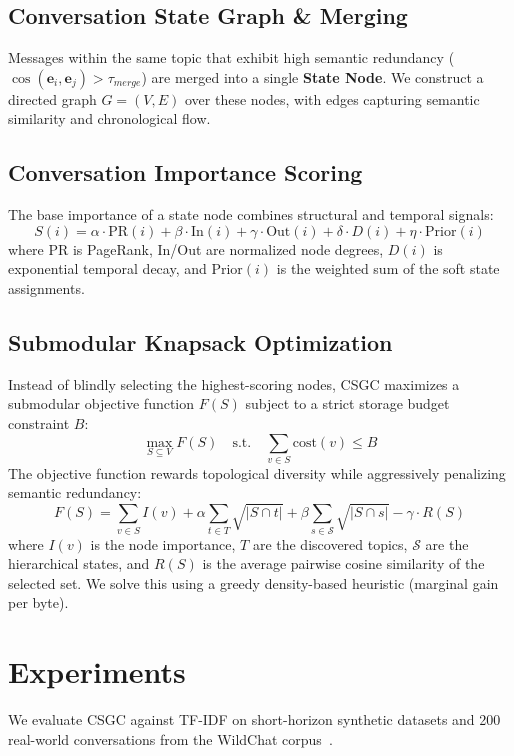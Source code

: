 \documentclass[10pt,twocolumn,letterpaper]{article}
\begin{document}
\subsection{Conversation State Graph \& Merging}
Messages within the same topic that exhibit high semantic redundancy ($\cos(\mathbf{e}_i, \mathbf{e}_j) > \tau_{merge}$) are merged into a single \textbf{State Node}. We construct a directed graph $G = (V, E)$ over these nodes, with edges capturing semantic similarity and chronological flow.

\subsection{Conversation Importance Scoring}
The base importance of a state node combines structural and temporal signals:
\begin{equation}
    S(i) = \alpha \cdot \text{PR}(i) + \beta \cdot \text{In}(i) + \gamma \cdot \text{Out}(i) + \delta \cdot D(i) + \eta \cdot \text{Prior}(i)
\end{equation}
where PR is PageRank, In/Out are normalized node degrees, $D(i)$ is exponential temporal decay, and $\text{Prior}(i)$ is the weighted sum of the soft state assignments.

\subsection{Submodular Knapsack Optimization}
Instead of blindly selecting the highest-scoring nodes, CSGC maximizes a submodular objective function $F(S)$ subject to a strict storage budget constraint $B$:
\begin{equation}
    \max_{S \subseteq V} F(S) \quad \text{s.t.} \quad \sum_{v \in S} \text{cost}(v) \le B
\end{equation}
The objective function rewards topological diversity while aggressively penalizing semantic redundancy:
\begin{equation}
    F(S) = \sum_{v \in S} I(v) + \alpha \sum_{t \in T} \sqrt{|S \cap t|} + \beta \sum_{s \in \mathcal{S}} \sqrt{|S \cap s|} - \gamma \cdot R(S)
\end{equation}
where $I(v)$ is the node importance, $T$ are the discovered topics, $\mathcal{S}$ are the hierarchical states, and $R(S)$ is the average pairwise cosine similarity of the selected set. We solve this using a greedy density-based heuristic (marginal gain per byte).

\section{Experiments}
We evaluate CSGC against TF-IDF on short-horizon synthetic datasets and 200 real-world conversations from the WildChat corpus~\cite{zhao2024wildchat}.
\end{document}
